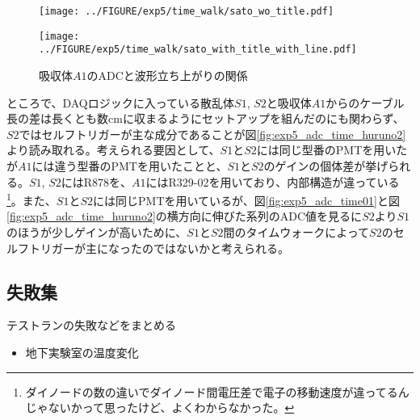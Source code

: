 \documentclass[../../main.tex]{subfiles}
\numberwithin{equation}{section}
\numberwithin{table}{section}
\numberwithin{figure}{section}
\begin{document}
    \begin{figure}[tbp]
      \begin{minipage}[b]{0.48\columnwidth}
        \centering
        \texttt{[image: ../FIGURE/exp5/time\_walk/sato\_wo\_title.pdf]}
        \label{fig:exp5_adc_time03}
      \end{minipage}
      \hspace{0.04\columnwidth} %
      \begin{minipage}[b]{0.48\columnwidth}
        \centering
        \texttt{[image: ../FIGURE/exp5/time\_walk/sato\_with\_title\_with\_line.pdf]}
        \label{fig:exp5_adc_time04}
      \end{minipage}
      \caption{吸収体$A1$のADCと波形立ち上がりの関係}\label{fig:exp5_adc_time_sato}
    \end{figure}

    ところで、DAQロジックに入っている散乱体$S1$, $S2$と吸収体$A1$からのケーブル長の差は長くとも数cmに収まるようにセットアップを組んだのにも関わらず、$S2$ではセルフトリガーが主な成分であることが図\ref{fig:exp5_adc_time_huruno2}より読み取れる。考えられる要因として、$S1$と$S2$には同じ型番のPMTを用いたが$A1$には違う型番のPMTを用いたことと、$S1$と$S2$のゲインの個体差が挙げられる。$S1$, $S2$にはR878を、$A1$にはR329-02を用いており、内部構造が違っている\footnote{ダイノードの数の違いでダイノード間電圧差で電子の移動速度が違ってるんじゃないかって思ったけど、よくわからなかった。}。また、$S1$と$S2$には同じPMTを用いているが、図\ref{fig:exp5_adc_time01}と図\ref{fig:exp5_adc_time_huruno2}の横方向に伸びた系列のADC値を見るに$S2$より$S1$のほうが少しゲインが高いために、$S1$と$S2$間のタイムウォークによって$S2$のセルフトリガーが主になったのではないかと考えられる。
  \FloatBarrier
  \subsection{失敗集}
    テストランの失敗などをまとめる
    \begin{itemize}
      \item 地下実験室の温度変化
    \end{itemize}
\end{document}
